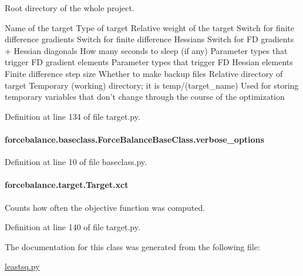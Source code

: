 Root directory of the whole project. 

Name of the target Type of target Relative weight of the target Switch for finite difference gradients Switch for finite difference Hessians Switch for F\-D gradients + Hessian diagonals How many seconds to sleep (if any) Parameter types that trigger F\-D gradient elements Parameter types that trigger F\-D Hessian elements Finite difference step size Whether to make backup files Relative directory of target Temporary (working) directory; it is temp/(target\-\_\-name) Used for storing temporary variables that don't change through the course of the optimization 

Definition at line 134 of file target.\-py.

\hypertarget{classforcebalance_1_1baseclass_1_1ForceBalanceBaseClass_a8088e1e20cbd6bc175fb9c9fe9fa0f18}{
\paragraph[{verbose\-\_\-options}]{\setlength{\rightskip}{0pt plus 5cm}forcebalance.\-baseclass.\-Force\-Balance\-Base\-Class.\-verbose\-\_\-options\hspace{0.3cm}{\ttfamily [inherited]}}}\label{classforcebalance_1_1baseclass_1_1ForceBalanceBaseClass_a8088e1e20cbd6bc175fb9c9fe9fa0f18}


Definition at line 10 of file baseclass.\-py.

\hypertarget{classforcebalance_1_1target_1_1Target_aad2e385cfbf7b4a68f1c2cb41133fe82}{
\paragraph[{xct}]{\setlength{\rightskip}{0pt plus 5cm}forcebalance.\-target.\-Target.\-xct\hspace{0.3cm}{\ttfamily [inherited]}}}\label{classforcebalance_1_1target_1_1Target_aad2e385cfbf7b4a68f1c2cb41133fe82}


Counts how often the objective function was computed. 



Definition at line 140 of file target.\-py.



The documentation for this class was generated from the following file\-:\begin{DoxyCompactItemize}
\item 
\hyperlink{leastsq_8py}{leastsq.\-py}\end{DoxyCompactItemize}
